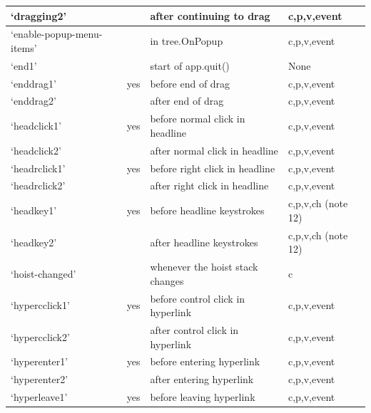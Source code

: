 \documentclass[a4paper,10pt,english]{sphinxmanual}
\begin{document}
\begin{longtable}{|l|l|l|l|}
`dragging2'
 &  & 
after  continuing to drag
 & 
c,p,v,event
\\\hline

`enable-popup-menu-items'
 &  & 
in tree.OnPopup
 & 
c,p,v,event
\\\hline

`end1'
 &  & 
start of app.quit()
 & 
None
\\\hline

`enddrag1'
 & 
yes
 & 
before end of drag
 & 
c,p,v,event
\\\hline

`enddrag2'
 &  & 
after  end of drag
 & 
c,p,v,event
\\\hline

`headclick1'
 & 
yes
 & 
before normal click in headline
 & 
c,p,v,event
\\\hline

`headclick2'
 &  & 
after  normal click in headline
 & 
c,p,v,event
\\\hline

`headrclick1'
 & 
yes
 & 
before right click in headline
 & 
c,p,v,event
\\\hline

`headrclick2'
 &  & 
after  right click in headline
 & 
c,p,v,event
\\\hline

`headkey1'
 & 
yes
 & 
before headline keystrokes
 & 
c,p,v,ch (note 12)
\\\hline

`headkey2'
 &  & 
after  headline keystrokes
 & 
c,p,v,ch (note 12)
\\\hline

`hoist-changed'
 &  & 
whenever the hoist stack changes
 & 
c
\\\hline

`hypercclick1'
 & 
yes
 & 
before control click in hyperlink
 & 
c,p,v,event
\\\hline

`hypercclick2'
 &  & 
after  control click in hyperlink
 & 
c,p,v,event
\\\hline

`hyperenter1'
 & 
yes
 & 
before entering hyperlink
 & 
c,p,v,event
\\\hline

`hyperenter2'
 &  & 
after  entering hyperlink
 & 
c,p,v,event
\\\hline

`hyperleave1'
 & 
yes
 & 
before leaving  hyperlink
 & 
c,p,v,event
\\\hline


\end{longtable}
\end{document}
